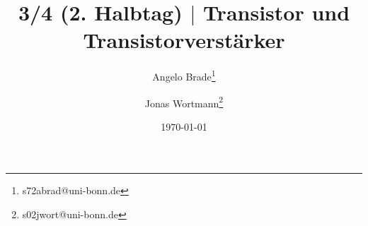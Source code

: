 \documentclass[a4paper,10pt]{article}
\numberwithin{equation}{section}
\begin{document}

\begin{titlepage}
	\title{3/4 (2. Halbtag) $|$ Transistor und Transistorverstärker}
	\author[1]{Angelo Brade\thanks{s72abrad@uni-bonn.de}}
	\author[1]{Jonas Wortmann\thanks{s02jwort@uni-bonn.de}}
	\date{\today}
\end{titlepage}

\maketitle
{}


\clearpage


\fancyhead[R]{\leftmark}
\fancyhead[L]{\thepage}
\fancyfoot[C]{}

\tableofcontents


\clearpage


\end{document}
